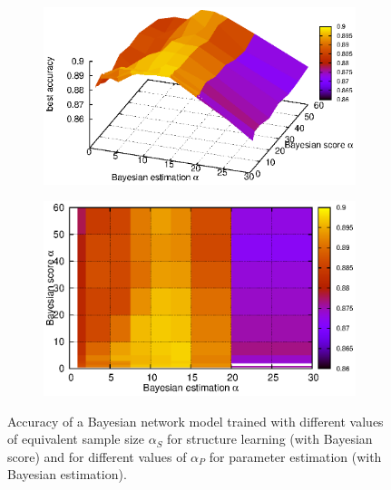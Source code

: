 \documentclass[english,cover]{fitthesis} %
\begin{document}
\begin{figure}[ht]
    \centering
    \begin{subfigure}[b]{0.45\linewidth}
        \hspace{-2.2cm}
        \includegraphics[scale=0.75]{fig/spam-holdout-whole-space-3d}
    \end{subfigure}
    \qquad
    \begin{subfigure}[b]{0.45\linewidth}
        \hspace{-1cm}
        \includegraphics[scale=0.75]{fig/spam-holdout-whole-space-map}
    \end{subfigure}
    \caption{Accuracy of a Bayesian network model trained with different values of equivalent sample size $\alpha_S$ for structure learning (with Bayesian score) and for different values of $\alpha_P$ for parameter estimation (with Bayesian estimation).}
    \label{fig:spam-holdout-whole-space}
\end{figure}
\end{document}
